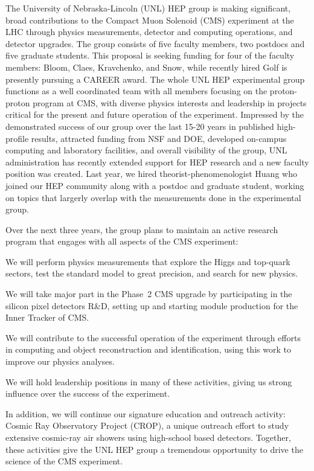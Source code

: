  The University of Nebraska-Lincoln (UNL) HEP group is making significant, broad contributions to the Compact Muon Solenoid (CMS) experiment at the LHC through physics measurements, detector and computing operations, and detector upgrades. The group consists of five faculty members, two postdocs and five graduate students. This proposal is seeking funding for four of the faculty members: Bloom, Claes, Kravchenko, and Snow, while recently hired Golf is presently pursuing a CAREER award. The whole UNL HEP experimental group functions as a well coordinated team with all members focusing on the proton-proton program at CMS, with diverse physics interests and leadership in projects critical for the present and future operation of the experiment. Impressed by the demonstrated success of our group over the last 15-20 years in published high-profile results, attracted funding from NSF and DOE, developed on-campus computing and laboratory facilities, and overall visibility of the group, UNL administration has recently extended support for HEP research and a new faculty position was created. Last year, we hired theorist-phenomenologist Huang who joined our HEP community along with a postdoc and graduate student, working on topics that largerly overlap with the measurements done in the experimental group. 

Over the next three years, the group plans to maintain an active research program that engages with all aspects of the CMS experiment:

\begin{packed_enum}
\item We will perform physics measurements that explore the Higgs and top-quark sectors, test the standard model to great precision, and search for new physics.
\item We will take major part in the Phase~2 CMS upgrade by participating in the silicon pixel detectors R\&D, setting up and starting module production for the Inner Tracker of CMS.
\item We will contribute to the successful operation of the experiment through efforts in computing and object reconstruction and identification, using this work to improve our physics analyses.
\item We will hold leadership positions in many of these activities, giving us strong influence over the success of the experiment.
\end{packed_enum}

In addition, we will continue our signature  education and outreach activity: Cosmic Ray Observatory Project (CROP), a unique outreach effort to study extensive cosmic-ray air showers using high-school based detectors.
Together, these activities give the UNL HEP group a tremendous opportunity to drive the science of the CMS experiment.
